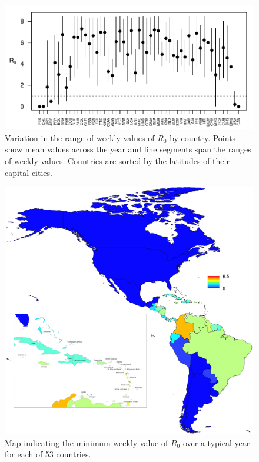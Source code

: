 \documentclass[11pt]{article}
\begin{document}
\newpage
\begin{figure}[!ht]
\begin{center}
\includegraphics{../output/beta_country.pdf}
\end{center}
\caption{
Variation in the range of weekly values of $R_0$ by country. Points show mean values across the year and line segments span the ranges of weekly values. Countries are sorted by the latitudes of their capital cities.
}
\end{figure}


\newpage
\begin{figure}[!ht]
\begin{center}
\includegraphics[scale=0.8]{../output/minr0.jpg}
\end{center}
\caption{
Map indicating the minimum weekly value of $R_0$ over a typical year for each of 53 countries.
}
\end{figure}
\end{document}
